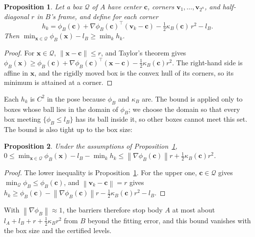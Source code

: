 \documentclass[journal]{IEEEtran}
\newtheorem{proposition}{Proposition}
\theoremstyle{definition}
\newcommand{\norm}[1]{\left\lVert #1\right\rVert}
\begin{document}
\begin{proposition}\label{prop:taylor}
Let a box $\mathcal Q$ of $A$ have center $\mathbf c$, corners $\mathbf v_1,\dots,\mathbf v_{2^n}$, and
half-diagonal $r$ in $B$'s frame, and define for each corner
\begin{equation}\label{eq:corner}
h_{k}=\phi_B(\mathbf c)+\nabla\phi_B(\mathbf c)^{\top}(\mathbf v_k-\mathbf c)
-\tfrac12\kappa_B(\mathbf c)\,r^2-l_B .
\end{equation}
Then $\min_{\mathbf x\in\mathcal Q}\phi_B(\mathbf x)-l_B\ge\min_kh_k$.
\end{proposition}
\begin{proof}
For $\mathbf x\in\mathcal Q$, $\norm{\mathbf x-\mathbf c}\le r$, and Taylor's theorem gives
$\phi_B(\mathbf x)\ge\phi_B(\mathbf c)+\nabla\phi_B(\mathbf c)^\top(\mathbf x-\mathbf c)
-\tfrac12\kappa_B(\mathbf c)r^2$. The right-hand side is affine in $\mathbf x$, and the rigidly moved
box is the convex hull of its corners, so its minimum is attained at a corner.
\end{proof}
Each $h_k$ is $C^2$ in the pose because $\phi_B$ and $\kappa_B$ are. The bound is applied only to
boxes whose ball lies in the domain of $\phi_B$; we choose the domain so that every box meeting
$\{\phi_B\le l_B\}$ has its ball inside it, so other boxes cannot meet this set. The bound is also
tight up to the box size:
\begin{proposition}\label{prop:tight}
Under the assumptions of Proposition~\ref{prop:taylor},
$0\le\min_{\mathbf x\in\mathcal Q}\phi_B(\mathbf x)-l_B-\min_kh_k\le\norm{\nabla\phi_B(\mathbf c)}r
+\tfrac12\kappa_B(\mathbf c)r^2$.
\end{proposition}
\begin{proof}
The lower inequality is Proposition~\ref{prop:taylor}. For the upper one, $\mathbf c\in\mathcal Q$
gives $\min_{\mathcal Q}\phi_B\le\phi_B(\mathbf c)$, and $\norm{\mathbf v_k-\mathbf c}=r$ gives
$h_k\ge\phi_B(\mathbf c)-\norm{\nabla\phi_B(\mathbf c)}r-\tfrac12\kappa_B(\mathbf c)r^2-l_B$.
\end{proof}
With $\norm{\nabla\phi_B}\approx1$, the barriers therefore stop body $A$ at most about
$l_A+l_B+r+\tfrac12\kappa_Br^2$ from $B$ beyond the fitting error, and this bound vanishes with the
box size and the certified levels.
\end{document}

